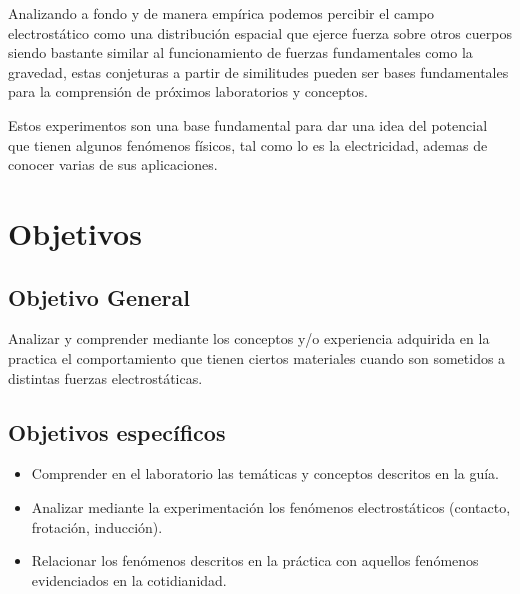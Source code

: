 \documentclass[letterpaper, 12pt]{report}
\begin{document}
\vspace{.5cm}

Analizando a fondo y de manera empírica podemos percibir el campo electrostático
como una distribución espacial que ejerce fuerza sobre otros cuerpos siendo
bastante similar al  funcionamiento de fuerzas fundamentales como la
gravedad, estas conjeturas a partir de similitudes pueden ser bases
fundamentales para la comprensión de próximos laboratorios y conceptos.

\vspace{.5cm}

Estos experimentos son una base fundamental para dar una
idea del potencial que tienen algunos fenómenos físicos, tal como lo es la
electricidad, ademas de conocer varias de sus aplicaciones.

\newpage

\section{Objetivos}

\subsection{Objetivo General}

Analizar  y comprender mediante los conceptos y/o experiencia adquirida en la
practica el comportamiento que tienen ciertos materiales cuando son sometidos
a distintas fuerzas electrostáticas.

\subsection{Objetivos específicos}

\begin{itemize}
	\item Comprender  en el laboratorio las temáticas y conceptos descritos
	      en la guía.
	\item Analizar mediante la experimentación los fenómenos
	      electrostáticos (contacto, frotación, inducción).
	\item Relacionar los fenómenos descritos en la práctica con aquellos
	      fenómenos evidenciados en la cotidianidad.
\end{itemize}

\newpage

\end{document}
